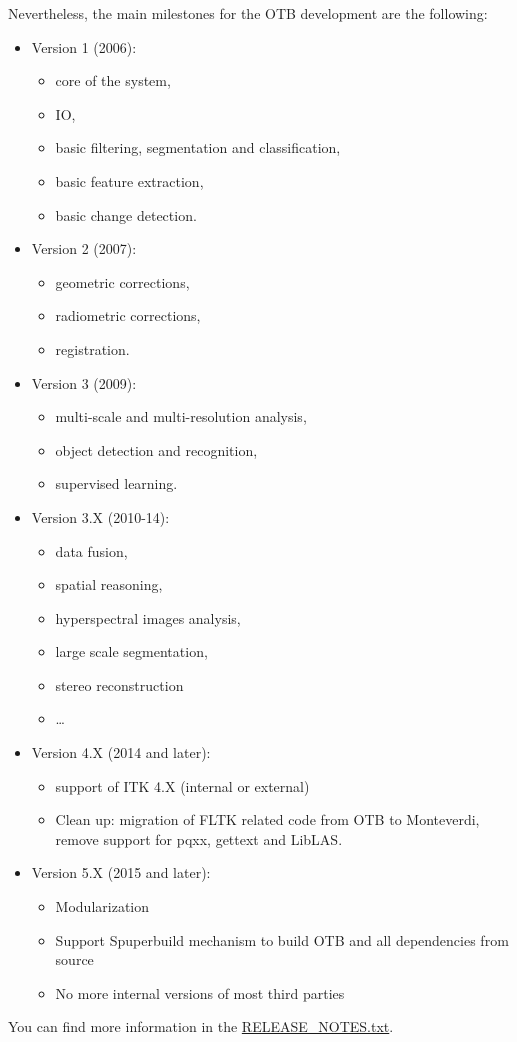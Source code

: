 Nevertheless, the main milestones for the OTB development are the
following:
\begin{itemize}
  \item{Version 1 (2006):}
  \begin{itemize}
    \item core of the system,
    \item IO,
    \item basic filtering, segmentation and classification,
    \item basic feature extraction,
    \item basic change detection.
  \end{itemize}
  \item{Version 2 (2007):}
  \begin{itemize}
    \item geometric corrections,
    \item radiometric corrections,
    \item registration.
  \end{itemize}
  \item{Version 3 (2009):}
  \begin{itemize}
    \item multi-scale and multi-resolution analysis,
    \item object detection and recognition,
    \item supervised learning.
  \end{itemize}
  \item{Version 3.X (2010-14):}
  \begin{itemize}
	  \item data fusion,
	  \item spatial reasoning,
    \item hyperspectral images analysis,
    \item large scale segmentation,
    \item stereo reconstruction
    \item \ldots
  \end{itemize}
  \item{Version 4.X (2014 and later):}
  \begin{itemize}
    \item support of ITK 4.X (internal or external)
    \item Clean up: migration of FLTK related code from OTB to
          Monteverdi, remove support for pqxx, gettext and LibLAS.
  \end{itemize}
  \item{Version 5.X (2015 and later):}
  \begin{itemize}
    \item Modularization
    \item Support Spuperbuild mechanism to build OTB and all dependencies
          from source
    \item No more internal versions of most third parties
  \end{itemize}

\end{itemize}

You can find more information in the \href{http://hg.orfeo-toolbox.org/OTB/file/tip/RELEASE_NOTES.txt}{RELEASE\_NOTES.txt}.
